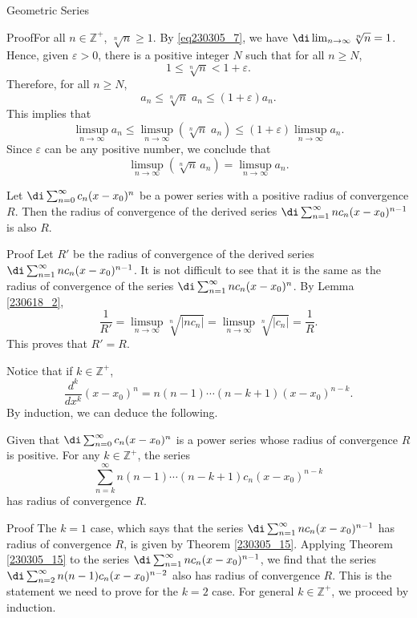 \begin{example}[label=230305_16]{Geometric Series}
\begin{example}[label=230304_9]{}
\begin{lemma}[label=230618_2]{}
\end{lemma}
\begin{myproof}{Proof}For all $n\in\mathbb{Z}^+$, $\sqrt[n]{n}\geq 1$. 
By \eqref{eq230305_7}, we have
$\di\lim_{n\to\infty}\sqrt[n]{n}=1$. Hence, given $\varepsilon>0$, there is a positive integer $N$ such that for all $n\geq N$,
\[ 1\leq\sqrt[n]{n}<1+\varepsilon.\]Therefore, for all $n\geq N$,
\[ a_n\leq \sqrt[n]{n}\;a_n\leq \left(1+\varepsilon\right)a_n.\]This implies that
\[ \limsup_{n\to\infty}a_n\leq\limsup_{n\to\infty}\left(\sqrt[n]{n}\;a_n\right)\leq \left(1+\varepsilon\right)\limsup_{n\to\infty}a_n.\]Since $\varepsilon$ can be any positive number, we conclude that \[\limsup_{n\to \infty}\left(\sqrt[n]{n}\, a_n\right)=\limsup_{n\to\infty}a_n.\]
\end{myproof}
\begin{theorem}[label=230305_15]{}
Let $\di\sum_{n=0}^{\infty}c_n(x-x_0)^n$ be a power series with a positive radius of convergence $R$. Then the radius of convergence of the  derived series $\di \sum_{n=1}^{\infty}nc_n(x-x_0)^{n-1} $ is also $R$.
\end{theorem}
\begin{myproof}{Proof}
Let $R'$ be the radius of convergence of the  derived  series $\di \sum_{n=1}^{\infty}nc_n(x-x_0)^{n-1}$. It is not difficult to see that it is the same as the radius of convergence of the series $\di \sum_{n=1}^{\infty}nc_n(x-x_0)^{n}$.  By Lemma \ref{230618_2},
\[\frac{1}{R'}=\limsup_{n\to\infty}\sqrt[n]{|nc_{n}|}= \limsup_{n\to\infty}\sqrt[n]{|c_n|}=\frac{1}{R}.\]
This proves that $R'=R$. 
\end{myproof}

Notice that
if $k\in\mathbb{Z}^+$,
\[\frac{d^k}{dx^k}(x-x_0)^n=n(n-1)\cdots (n-k+1)(x-x_0)^{n-k}.\]
By induction, we can deduce the following.
\begin{corollary}{}
Given that   $\di \sum_{n=0}^{\infty}c_n(x-x_0)^n$ is a power series whose radius of convergence $R$ is positive. For any $k\in\mathbb{Z}^+$, the series \[ \sum_{n=k}^{\infty}n(n-1)\cdots (n-k+1)c_n(x-x_0)^{n-k}\] has radius of convergence $R$.
\end{corollary}
\begin{myproof}{Proof}
The $k=1$ case, which says that the series $\di\sum_{n=1}^{\infty}nc_n(x-x_0)^{n-1}$ has radius of convergence $R$,  is given by Theorem \ref{230305_15}. Applying Theorem  \ref{230305_15} to the series $\di\sum_{n=1}^{\infty}nc_n(x-x_0)^{n-1}$, we find that the series  $\di\sum_{n=2}^{\infty}n(n-1)c_n(x-x_0)^{n-2}$ also has radius of convergence $R$. This is the statement we need to prove for the $k=2$ case. For general $k\in\mathbb{Z}^+$, we  proceed by induction.
\end{myproof}


\end{example}
\end{example}
